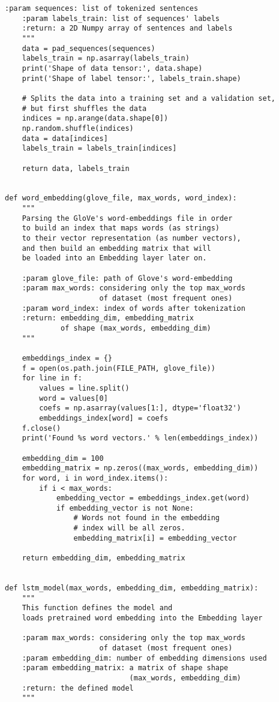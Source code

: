 \begin{lstlisting}[language=iPython]
	:param sequences: list of tokenized sentences
	:param labels_train: list of sequences' labels
	:return: a 2D Numpy array of sentences and labels
	"""
	data = pad_sequences(sequences)
	labels_train = np.asarray(labels_train)
	print('Shape of data tensor:', data.shape)
	print('Shape of label tensor:', labels_train.shape)
	
	# Splits the data into a training set and a validation set, 
	# but first shuffles the data
	indices = np.arange(data.shape[0])
	np.random.shuffle(indices)
	data = data[indices]
	labels_train = labels_train[indices]
	
	return data, labels_train


def word_embedding(glove_file, max_words, word_index):
	"""
	Parsing the GloVe's word-embeddings file in order 
	to build an index that maps words (as strings) 
	to their vector representation (as number vectors),
	and then build an embedding matrix that will 
	be loaded into an Embedding layer later on.
	
	:param glove_file: path of Glove's word-embedding
	:param max_words: considering only the top max_words 
					  of dataset (most frequent ones)
	:param word_index: index of words after tokenization
	:return: embedding_dim, embedding_matrix 
			 of shape (max_words, embedding_dim)
	"""
	
	embeddings_index = {}
	f = open(os.path.join(FILE_PATH, glove_file))
	for line in f:
		values = line.split()
		word = values[0]
		coefs = np.asarray(values[1:], dtype='float32')
		embeddings_index[word] = coefs
	f.close()
	print('Found %s word vectors.' % len(embeddings_index))
	
	embedding_dim = 100
	embedding_matrix = np.zeros((max_words, embedding_dim))
	for word, i in word_index.items():
		if i < max_words:
			embedding_vector = embeddings_index.get(word)
			if embedding_vector is not None:
				# Words not found in the embedding 
				# index will be all zeros.
				embedding_matrix[i] = embedding_vector
	
	return embedding_dim, embedding_matrix


def lstm_model(max_words, embedding_dim, embedding_matrix):
	"""
	This function defines the model and
	loads pretrained word embedding into the Embedding layer
	
	:param max_words: considering only the top max_words 
					  of dataset (most frequent ones)
	:param embedding_dim: number of embedding dimensions used
	:param embedding_matrix: a matrix of shape shape 
							 (max_words, embedding_dim)
	:return: the defined model
	"""
	

\end{lstlisting}

